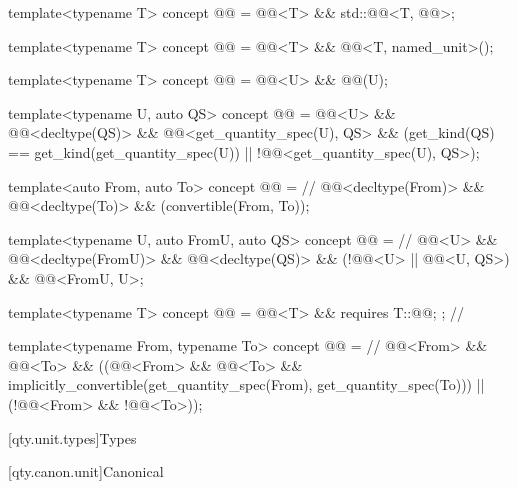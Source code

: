 \begin{itemdecl}
template<typename T>
concept @@ = @@<T> && std::@@<T, @@>;

template<typename T>
concept @@ = @@<T> && @@<T, named_unit>();

template<typename T>
concept @@ = @@<U> && @@(U{});

template<typename U, auto QS>
concept @@ = @@<U> && @@<decltype(QS)> &&
                 @@<get_quantity_spec(U{}), QS> &&
                 (get_kind(QS) == get_kind(get_quantity_spec(U{})) ||
                  !@@<get_quantity_spec(U{}), QS>);

template<auto From, auto To>
concept @@ =                                     // \expos
  @@<decltype(From)> && @@<decltype(To)> && (convertible(From, To));

template<typename U, auto FromU, auto QS>
concept @@ =                                    // \expos
  @@<U> && @@<decltype(FromU)> && @@<decltype(QS)> &&
  (!@@<U> || @@<U, QS>) && @@<FromU, U{}>;

template<typename T>
concept @@ = @@<T> && requires { T::@@; };  // \expos

template<typename From, typename To>
concept @@ =                              // \expos
  @@<From> && @@<To> &&
  ((@@<From> && @@<To> &&
    implicitly_convertible(get_quantity_spec(From{}), get_quantity_spec(To{}))) ||
   (!@@<From> && !@@<To>));
\end{itemdecl}

[qty.unit.types]{Types}

[qty.canon.unit]{Canonical}

